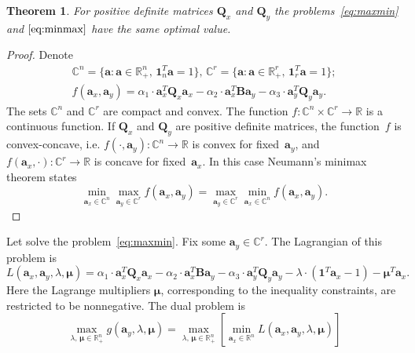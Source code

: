 \documentclass[12pt,twoside]{article}
\newtheorem{theorem}{Theorem}
\newcommand{\ba}{\mathbf{a}}
\newcommand{\bB}{\mathbf{B}}
\newcommand{\bQ}{\mathbf{Q}}
\newcommand{\bbR}{\mathbb{R}}
\newcommand{\bOne}{\boldsymbol{1}}
\begin{document}
\begin{theorem}
	For positive definite matrices $\bQ_x$ and $\bQ_y$ the problems~\eqref{eq:maxmin} and $\eqref{eq:minmax}$ have the same optimal value. 
\end{theorem}
\begin{proof}
	Denote 
	\begin{align*}
	\mathbb{C}^n = \{\ba : \ba \in \bbR^n_+, \, \bOne_n^T\ba=1\}, \, \mathbb{C}^r = \{\ba : \ba \in \bbR^r_+, \, \bOne_r^T\ba=1\}; \\ 
	f(\ba_x, \ba_y) = \alpha_1 \cdot \ba_x^T \bQ_x \ba_x - \alpha_2 \cdot \ba_x^T \bB \ba_y - \alpha_3 \cdot \ba_y^T \bQ_y \ba_y.
	\end{align*}
	The sets $\mathbb{C}^n$ and $\mathbb{C}^r$ are compact and convex. The function $f: \mathbb{C}^n \times \mathbb{C}^r \rightarrow \bbR$ is a continuous function. If $\bQ_x$ and $\bQ_y$ are positive definite matrices, the function~$f$ is convex-concave, i.e.
	$f(\cdot, \ba_y): \mathbb{C}^n \rightarrow \bbR$ is convex for fixed~$\ba_y$, and $f(\ba_x, \cdot): \mathbb{C}^r \rightarrow \bbR$ is concave for fixed~$\ba_x$. 
	In this case Neumann's minimax theorem states
	\[
	\min_{\ba_x \in \mathbb{C}^n} \max_{\ba_y \in \mathbb{C}^r} f(\ba_x, \ba_y) = \max_{\ba_y \in \mathbb{C}^r} \min_{\ba_x\in \mathbb{C}^n} f(\ba_x, \ba_y).
	\]
\end{proof}

Let solve the problem~\eqref{eq:maxmin}. Fix some $\ba_y \in \mathbb{C}^r$.
The Lagrangian of this problem is
\[
	L(\ba_x, \ba_y, \lambda, \boldsymbol{\mu}) = \alpha_1 \cdot \ba_x^T \bQ_x \ba_x - \alpha_2 \cdot \ba_x^T \bB \ba_y - \alpha_3 \cdot \ba_y^T \bQ_y \ba_y - \lambda \cdot  (\bOne^T \ba_x - 1) - \boldsymbol{\mu}^T \ba_x.
\]
Here the Lagrange multipliers $\boldsymbol{\mu}$, corresponding to the inequality constraints, are restricted to be nonnegative. 
The dual problem is
\[
	\max_{\lambda, \, \boldsymbol{\mu} \in \bbR_+^{n}} g(\ba_y, \lambda, \boldsymbol{\mu}) = \max_{\lambda, \, \boldsymbol{\mu} \in \bbR_+^{n}}  \left[\min_{\ba_x \in \bbR^n} L(\ba_x, \ba_y, \lambda, \boldsymbol{\mu}) \right]
\]
\end{document}
